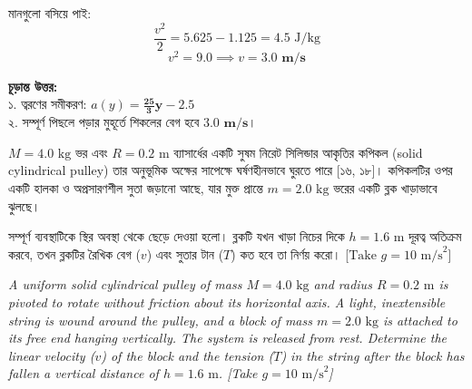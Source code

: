 \documentclass[12pt, a4paper]{article}
\begin{document}
\begin{tcolorbox}[solutionbox={সমাধান (Solution)}]
মানগুলো বসিয়ে পাই:
$$\frac{v^2}{2} = 5.625 - 1.125 = 4.5\text{ J/kg}$$ 
$$v^2 = 9.0 \implies v = \mathbf{3.0\text{ m/s}}$$

\vspace{1em}
\begin{tcolorbox}[answerbox]
\textbf{চূড়ান্ত উত্তর:} \\
১. ত্বরণের সমীকরণ: $a(y) = \mathbf{\frac{25}{3} y - 2.5}$ \\
২. সম্পূর্ণ পিছলে পড়ার মুহূর্তে শিকলের বেগ হবে $\mathbf{3.0\text{ m/s}}$।
\end{tcolorbox}
\end{tcolorbox}


\begin{tcolorbox}[questionbox={প্রশ্ন(Question) 20}]
\noindent
$M = 4.0\text{ kg}$ ভর এবং $R = 0.2\text{ m}$ ব্যাসার্ধের একটি সুষম নিরেট সিলিন্ডার আকৃতির কপিকল (solid cylindrical pulley) তার অনুভূমিক অক্ষের সাপেক্ষে ঘর্ষণহীনভাবে ঘুরতে পারে [১৬, ১৮]। কপিকলটির ওপর একটি হালকা ও অপ্রসারণশীল সুতা জড়ানো আছে, যার মুক্ত প্রান্তে $m = 2.0\text{ kg}$ ভরের একটি ব্লক খাড়াভাবে ঝুলছে। 

\vspace{0.3em}
\noindent
সম্পূর্ণ ব্যবস্থাটিকে স্থির অবস্থা থেকে ছেড়ে দেওয়া হলো। ব্লকটি যখন খাড়া নিচের দিকে $h = 1.6\text{ m}$ দূরত্ব অতিক্রম করবে, তখন ব্লকটির রৈখিক বেগ ($v$) এবং সুতার টান ($T$) কত হবে তা নির্ণয় করো। [$\text{Take } g = 10\text{ m/s}^2$]

\vspace{0.8em}
\begin{english}
\noindent\textit{\color{darkgray}
A uniform solid cylindrical pulley of mass $M = 4.0\text{ kg}$ and radius $R = 0.2\text{ m}$ is pivoted to rotate without friction about its horizontal axis. A light, inextensible string is wound around the pulley, and a block of mass $m = 2.0\text{ kg}$ is attached to its free end hanging vertically. The system is released from rest. Determine the linear velocity ($v$) of the block and the tension ($T$) in the string after the block has fallen a vertical distance of $h = 1.6\text{ m}$. [Take $g = 10\text{ m/s}^2$]
}
\end{english}
\end{tcolorbox}
\end{document}
